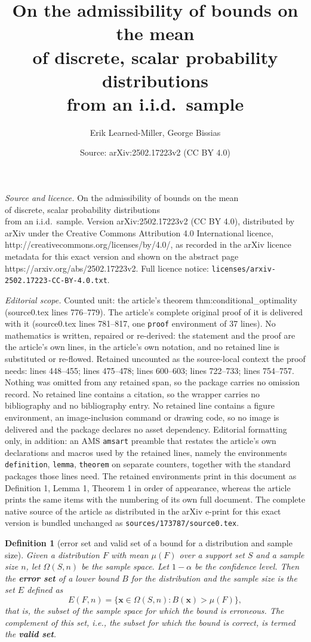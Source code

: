 \documentclass[10pt,a4paper]{amsart}
\title{On the admissibility of bounds on the mean \\of discrete, scalar probability distributions\\ from an i.i.d.~sample}
\author{Erik Learned-Miller, George Bissias}
\date{Source: arXiv:2502.17223v2 (CC BY 4.0)}
\newtheorem{definition}{Definition}
\def\x{\mathbf{x}}
\begin{document}
\maketitle

\noindent\emph{Source and licence.} On the admissibility of bounds on the mean \\of discrete, scalar probability distributions\\ from an i.i.d.~sample. Version arXiv:2502.17223v2 (CC BY 4.0), distributed by arXiv under the Creative Commons Attribution 4.0 International licence, http://creativecommons.org/licenses/by/4.0/, as recorded in the arXiv licence metadata for this exact version and shown on the abstract page https://arxiv.org/abs/2502.17223v2. Full licence notice: \texttt{licenses/arxiv-2502.17223-CC-BY-4.0.txt}.\par\smallskip

\noindent\textit{Editorial scope.} Counted unit: the article's theorem thm:conditional\_optimality (source0.tex lines 776--779). The article's complete original proof of it is delivered with it (source0.tex lines 781--817, one \texttt{proof} environment of 37 lines). No mathematics is written, repaired or re-derived: the statement and the proof are the article's own lines, in the article's own notation, and no retained line is substituted or re-flowed.  Retained uncounted as the source-local context the proof needs: lines 448--455; lines 475--478; lines 600--603; lines 722--733; lines 754--757.  Nothing was omitted from any retained span, so the package carries no omission record.  No retained line contains a citation, so the wrapper carries no bibliography and no bibliography entry.  No retained line contains a figure environment, an image-inclusion command or drawing code, so no image is delivered and the package declares no asset dependency.  Editorial formatting only, in addition: an AMS \texttt{amsart} preamble that restates the article's own declarations and macros used by the retained lines, namely the environments \texttt{definition}, \texttt{lemma}, \texttt{theorem} on separate counters, together with the standard packages those lines need.  The retained environments print in this document as Definition 1, Lemma 1, Theorem 1 in order of appearance, whereas the article prints the same items with the numbering of its own full document.  The complete native source of the article as distributed in the arXiv e-print for this exact version is bundled unchanged as \texttt{sources/173787/source0.tex}.
\begin{definition}[error set and valid set of a bound for a distribution and sample size]
\label{def:error_set_of_valid_bound}
Given a distribution $F$ with mean $\mu(F)$ over a support set $S$ and a sample size $n$, let $\Omega(S,n)$ be the sample space. Let $1-\alpha$ be the confidence level. Then the {\bf error set} of a lower bound $B$ for the distribution and the sample size is the set $E$ defined as 
$$
E(F,n) = \{\x\in \Omega(S,n): B(\x) > \mu(F)\},
$$  
that is, the subset of the sample space for which the bound is erroneous. The complement of this set, i.e., the subset for which the bound is correct, is termed the {\bf valid set}.
\end{definition}
\end{document}
